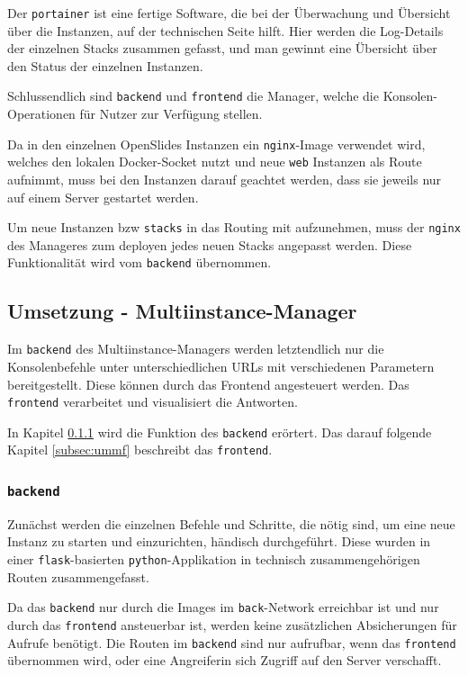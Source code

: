 \documentclass[11pt,a4paper]{article}
\begin{document}
Der \texttt{portainer} ist eine fertige Software, die bei der Überwachung und 
Übersicht über die Instanzen, auf der technischen Seite hilft. Hier werden die 
Log-Details der einzelnen Stacks zusammen gefasst, und man gewinnt eine 
Übersicht über den Status der einzelnen Instanzen.

Schlussendlich sind \texttt{backend} und \texttt{frontend} die Manager, welche 
die Konsolen-Operationen für Nutzer zur Verfügung stellen.

Da in den einzelnen OpenSlides Instanzen ein \texttt{nginx}-Image verwendet 
wird, welches den lokalen Docker-Socket nutzt und neue \texttt{web} Instanzen 
als Route aufnimmt, muss bei den Instanzen darauf geachtet werden, dass sie 
jeweils nur auf einem Server gestartet werden.

Um neue Instanzen bzw \texttt{stacks} in das Routing mit aufzunehmen, muss der 
\texttt{nginx} des Manageres zum deployen jedes neuen Stacks angepasst werden. 
Diese Funktionalität wird vom \texttt{backend} übernommen.
\subsection{Umsetzung - Multiinstance-Manager}
\label{sec:umm}
Im \texttt{backend} des Multiinstance-Managers werden letztendlich nur die 
Konsolenbefehle unter unterschiedlichen URLs mit  verschiedenen Parametern 
bereitgestellt. Diese können durch das Frontend angesteuert werden. Das 
\texttt{frontend} verarbeitet und visualisiert die Antworten.

In Kapitel \ref{subsec:ummb} wird die Funktion des \texttt{backend} erörtert. 
Das darauf folgende Kapitel \ref{subsec:ummf} beschreibt das \texttt{frontend}.
\subsubsection{\texttt{backend}} \label{subsec:ummb}
Zunächst werden die einzelnen Befehle und Schritte, die nötig sind, um eine neue Instanz zu starten und einzurichten, händisch durchgeführt. Diese wurden in einer \texttt{flask}-basierten \texttt{python}-Applikation in technisch 
zusammengehörigen Routen zusammengefasst.

Da das \texttt{backend} nur durch die Images im \texttt{back}-Network 
erreichbar ist und nur durch das \texttt{frontend} ansteuerbar ist, werden 
keine zusätzlichen Absicherungen für Aufrufe benötigt. Die Routen im 
\texttt{backend} sind nur aufrufbar, wenn das \texttt{frontend} übernommen wird,
oder eine Angreiferin sich Zugriff auf den Server verschafft.
\end{document}

